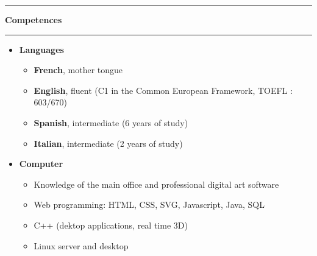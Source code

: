 \documentclass[a4paper,11pt]{article} %
\newcommand{\trad}[2]{#1}
\newcommand{\titre}[1]{%
	\begin{center}
	\rule{\textwidth}{1pt}
	\par
	\vspace{0.1cm}
        \textbf{\large #1}
	\par\rule{\textwidth}{1pt}
	\end{center}
	}
\begin{document}
\titre{\trad{Competences}{Compétences}}

\begin{itemize}
\item \textbf{\trad{Languages}{Langues}}
	\begin{itemize} 
	\trad{\item \textbf{French}, mother tongue}{}
	\item \trad{\textbf{English}, fluent (C1 in the Common European Framework, TOEFL : 603/670)}
				{\textbf{Anglais}, autonome (niveau C1 du cadre européen de référence, TOEFL : 603/670)}
	\item \trad{\textbf{Spanish}, intermediate (6 years of study)}
				{\textbf{Espagnol}, niveau intermédiaire (6 années d'études)}
	\item \trad{\textbf{Italian}, intermediate (2 years of study)}
				{\textbf{Italien}, niveau intermédiaire (2 années d'études)}
	\end{itemize}
\item \textbf{\trad{Computer}{Informatique}}
	\begin{itemize}
	\item \trad{Knowledge of the main office and professional digital art software}             {Maîtrise des principaux outils de bureautique et d'infographie professionnelle}
	\item \trad{Web programming: HTML, CSS, SVG, Javascript, Java, SQL}							{Programmation web: HTML, CSS, SVG, Javascript, Java, SQL}
	\item \trad{C++ (dektop applications, real time 3D)}										{C++ (applications de bureau, 3D temps réel)}
	\item \trad{Linux server and desktop}                                                        {Utilisation quotidienne d'environnements Linux et administration de serveurs Linux}
	\end{itemize}
\end{itemize}
\end{document}
